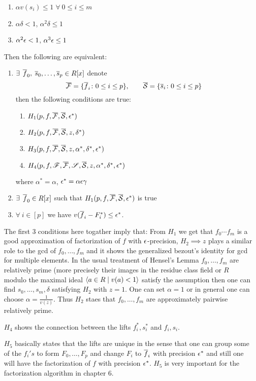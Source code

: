 \begin{itemize}
\begin{enumerate}
		\item $\alpha v(s_i)\leq 1$ $\forall\ 0\leq i\leq m$
		\item $\alpha\delta <1$, $\alpha^2\delta \leq 1$
		\item $\alpha^2\epsilon<1$, $\alpha^3\epsilon\leq 1$
	\end{enumerate}Then the following are equivalent:
	\begin{enumerate}[label=(\roman*)]
		\item $\exists$ $\overline{f}_0,$ $\overline{s}_0,\dots,\overline{s}_p\in R[x]$ denote $$\overline{\mathcal{F}}=\{\overline{f}_i\colon 0\leq i\leq p\},\qquad \overline{\mathcal{S}}=\{\overline{s}_i\colon 0\leq i\leq p\}$$then the following conditions are true:\begin{enumerate}
			\item $H_1(p,f,\overline{\mathcal{F}},\overline{\mathcal{S}},\epsilon^*)$
			\item $H_2(p,f,\overline{\mathcal{F}},\overline{\mathcal{S}},z,\delta^*)$
			\item $H_3(p,f,\overline{\mathcal{F}},\overline{\mathcal{S}},z,\alpha^*, \delta^*,\epsilon^*)$
			\item $H_4(p,f,{\mathscr{F}},\overline{\mathcal{F}},{\mathscr{S}}, \overline{\mathcal{S}},z,\alpha^*,\delta^*,\epsilon^*)$
		\end{enumerate}where $\alpha^*=\alpha$, $\epsilon^*=\alpha\epsilon\gamma$
		\item $\exists$ $\overline{f}_0\in R[x]$ such that $H_1(p,f,\overline{\mathcal{F}},\overline{\mathcal{S}},\epsilon^*)$ is true
		\item $\forall\ i\in[p]$ we have $v(\overline{f}_i-F_i^*)\leq \epsilon^*$.
	\end{enumerate}
\end{itemize}
The first 3 conditions here togather imply that: From $H_1$ we get that $f_0\cdots f_m$ is a good approximation of factorization of $f$ with $\epsilon$-precision, $H_2\implies z$ plays a similar role to the gcd of $f_0,\dots,f_m$ and it shows the generalized bezout's identity for gcd  for multiple elements. In the usual treatment of Hensel's Lemma $f_0,\dots, f_m$ are relatively prime (more precisely their images in the residue class field or $R$ modulo the maximal ideal $\langle a\in R\mid v(a)<1\rangle$ satisfy the assumption then one can find $s_0,\dots,s_m,\delta$ satisfying $H_2$ with $z=1$. One can set $\alpha=1$ or in general one can choose $\alpha=\frac1{v(z)}$. Thus $H_2$ staes that $f_0,\dots, f_m$ are approximately pairwise relatively prime.

$H_4$ shows the connection between the lifts $f_i^*,s_i^*$ and $f_i,s_i$.

$H_5$ basically states that the lifts are unique in the sense that one can group some of the $f_i's$ to form $F_0,\dots, F_p$ and change $F_i$ to $\overline{f}_i$ with precision $\epsilon^*$ and still one will have the factorization of $f$ with precision $\epsilon^*$. $H_5$ is very important for the factorization algorithm in chapter 6. 

